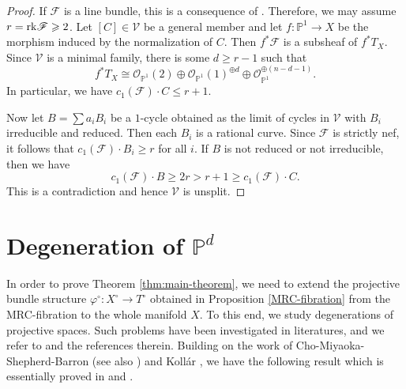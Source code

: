 \documentclass[english,reqno]{amsart}
\newcommand\cV{{\mathcal V}}
\newcommand\bbP{{\mathbb P}}
\newcommand\sF{{\mathscr F}}
\newcommand\sO{{\mathscr O}}
\newcommand{\rk}{{\rm rk}}
\theoremstyle{plain}
\theoremstyle{definition}
\numberwithin{equation}{section} %
\begin{document}
\begin{proof}
    If $\sF$ is a line bundle, this is a consequence of \cite[Corollaire]{Druel2004}. Therefore, we may assume $r=\rk \sF \geqslant 2$. Let $[C]\in \cV$ be a general member  and let $f\colon \bbP^1\rightarrow X$ be the morphism induced by the normalization of $C$. Then $f^*\sF$ is a subsheaf of $f^*T_X$. Since $\cV$ is a minimal family, there is some $d\geqslant r-1$ such that
    \[f^*T_X \cong \sO_{\bbP^1}(2)\oplus\sO_{\bbP^1}(1)^{\oplus d}\oplus\sO_{\bbP^1}^{\oplus (n-d-1)}.\]
    In particular, we have $c_1(\sF)\cdot C\leqslant r+1$.

    Now let $B=\sum a_i B_i$ be a $1$-cycle obtained as the limit of cycles in $\cV$ with $B_i$ irreducible and reduced.
    Then each $B_i$ is a rational curve. Since $\sF$ is strictly nef, it follows that  $c_1(\sF)\cdot B_i\geqslant r$ for all $i$.
    If $B$ is not reduced or not irreducible, then we have  $$c_1(\sF)\cdot B\geqslant 2r >r+1 \geqslant c_1(\sF)\cdot C.$$  This is a contradiction  and  hence $\cV$ is unsplit.
\end{proof}







\baselineskip

\section{Degeneration of $\bbP^d$}


\label{section:degeneration-P^d}

In order to prove Theorem \ref{thm:main-theorem}, we need to extend the projective bundle structure  $\varphi^\circ \colon X^\circ \to T^\circ$  obtained in Proposition \ref{MRC-fibration} from the MRC-fibration  to the whole manifold $X$.
To this end, we  study degenerations of  projective spaces.   Such  problems  have  been investigated in literatures, and we refer to \cite{Fujita1987,HoeringNovelli2013,AraujoDruel2014} and the references therein. Building on the work of Cho-Miyaoka-Shepherd-Barron \cite{ChoMiyaokaShepherd-Barron2002} (see also \cite{Kebekus2002}) and Koll\'ar \cite{Kollar2011}, we have  the following result which is essentially proved in \cite{HoeringNovelli2013} and \cite{AraujoDruel2014}. 
\end{document}
